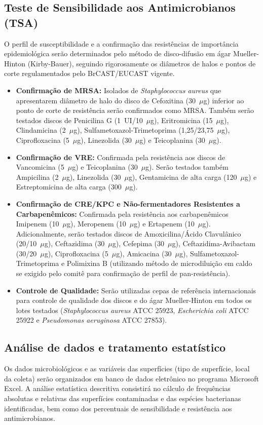 \documentclass[12pt,a4paper]{article}
\begin{document}
\subsection{Teste de Sensibilidade aos Antimicrobianos (TSA)}
O perfil de susceptibilidade e a confirmação das resistências de importância epidemiológica serão determinados pelo método de disco-difusão em ágar Mueller-Hinton (Kirby-Bauer), seguindo rigorosamente os diâmetros de halos e pontos de corte regulamentados pelo BrCAST/EUCAST vigente.
\begin{itemize}
    \item \textbf{Confirmação de MRSA:} Isolados de \textit{Staphylococcus aureus} que apresentarem diâmetro de halo do disco de Cefoxitina (30~$\mu$g) inferior ao ponto de corte de resistência serão confirmados como MRSA. Também serão testados discos de Penicilina G (1~UI/10~$\mu$g), Eritromicina (15~$\mu$g), Clindamicina (2~$\mu$g), Sulfametoxazol-Trimetoprima (1,25/23,75~$\mu$g), Ciprofloxacina (5~$\mu$g), Linezolida (30~$\mu$g) e Teicoplanina (30~$\mu$g).
    \item \textbf{Confirmação de VRE:} Confirmada pela resistência aos discos de Vancomicina (5~$\mu$g) e Teicoplanina (30~$\mu$g). Serão testados também Ampicilina (2~$\mu$g), Linezolida (30~$\mu$g), Gentamicina de alta carga (120~$\mu$g) e Estreptomicina de alta carga (300~$\mu$g).
    \item \textbf{Confirmação de CRE/KPC e Não-fermentadores Resistentes a Carbapenêmicos:} Confirmada pela resistência aos carbapenêmicos Imipenem (10~$\mu$g), Meropenem (10~$\mu$g) e Ertapenem (10~$\mu$g). Adicionalmente, serão testados discos de Amoxicilina/Ácido Clavulânico (20/10~$\mu$g), Ceftazidima (30~$\mu$g), Cefepima (30~$\mu$g), Ceftazidima-Avibactam (30/20~$\mu$g), Ciprofloxacina (5~$\mu$g), Amicacina (30~$\mu$g), Sulfametoxazol-Trimetoprima e Polimixina B (utilizando método de microdiluição em caldo se exigido pelo comitê para confirmação de perfil de pan-resistência).
    \item \textbf{Controle de Qualidade:} Serão utilizadas cepas de referência internacionais para controle de qualidade dos discos e do ágar Mueller-Hinton em todos os lotes testados (\textit{Staphylococcus aureus} ATCC 25923, \textit{Escherichia coli} ATCC 25922 e \textit{Pseudomonas aeruginosa} ATCC 27853).
\end{itemize}

\subsection{Análise de dados e tratamento estatístico}
Os dados microbiológicos e as variáveis das superfícies (tipo de superfície, local da coleta) serão organizados em banco de dados eletrônico no programa Microsoft Excel. A análise estatística descritiva consistirá no cálculo de frequências absolutas e relativas das superfícies contaminadas e das espécies bacterianas identificadas, bem como dos percentuais de sensibilidade e resistência aos antimicrobianos.
\end{document}
